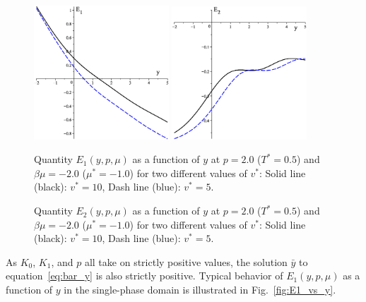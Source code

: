 \documentclass[12pt]{article}
\numberwithin{equation}{section}
\begin{document}
	\begin{figure}[htbp]
		\includegraphics[width=0.45\textwidth,angle=0]{E1_vs_y2}
		\hfill
		\includegraphics[width=0.45\textwidth,angle=0]{E2_vs_y}
		\\
		\parbox{0.45\textwidth}{\caption{\label{fig:E1_vs_y} Quantity $E_1(y,p,\mu)$ as a function of $y$ at $p=2.0$ ($T^*=0.5$) and $\beta\mu=-2.0$ ($\mu^*=-1.0$) for two different values of $v^*$: Solid line (black): $v^* = 10$, Dash line (blue): $v^* = 5$.}}
		\hfill
		\parbox{0.45\textwidth}{\caption{\label{fig:E2_vs_y} Quantity $E_2(y,p,\mu)$ as a function of $y$ at $p=2.0$ ($T^*=0.5$) and $\beta\mu=-2.0$ ($\mu^*=-1.0$) for two different values of $v^*$: Solid line (black): $v^* = 10$, Dash line (blue): $v^* = 5$.}}
	\end{figure}
	
	As $K_0$, $K_1$, and $p$ all take on strictly positive values, the solution $\bar{y}$ to equation~\eqref{eq:bar_y} is also strictly positive.
	Typical behavior of $E_1(y,p,\mu)$ as a function of $y$ in the single-phase domain is illustrated in Fig.~\ref{fig:E1_vs_y}.
	
\end{document}
